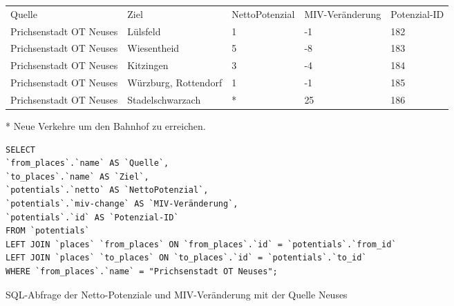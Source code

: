 \begin{tabularx}{\textwidth}{*5{X}}
Quelle & Ziel & NettoPotenzial & MIV-Veränderung & Potenzial-ID\\ 
Prichsenstadt OT Neuses & Lülsfeld & 1 & -1 & 182\\ 
Prichsenstadt OT Neuses & Wiesentheid & 5 & -8 & 183\\ 
Prichsenstadt OT Neuses & Kitzingen & 3 & -4 & 184\\ 
Prichsenstadt OT Neuses & Würzburg, Rottendorf & 1 & -1 & 185\\ 
Prichsenstadt OT Neuses & Stadelschwarzach & * & 25 & 186\\ 
\end{tabularx}
\newline
\newline
* Neue Verkehre um den Bahnhof zu erreichen.
\newline
\begin{listing}[htbp]
\begin{verbatim}
SELECT
`from_places`.`name` AS `Quelle`, 
`to_places`.`name` AS `Ziel`, 
`potentials`.`netto` AS `NettoPotenzial`, 
`potentials`.`miv-change` AS `MIV-Veränderung`, 
`potentials`.`id` AS `Potenzial-ID`
FROM `potentials`
LEFT JOIN `places` `from_places` ON `from_places`.`id` = `potentials`.`from_id`
LEFT JOIN `places` `to_places` ON `to_places`.`id` = `potentials`.`to_id`
WHERE `from_places`.`name` = "Prichsenstadt OT Neuses";
\end{verbatim}
\caption{SQL-Abfrage der Netto-Potenziale und MIV-Veränderung mit der Quelle Neuses}\label{lst-fz-neuses}
\end{listing}